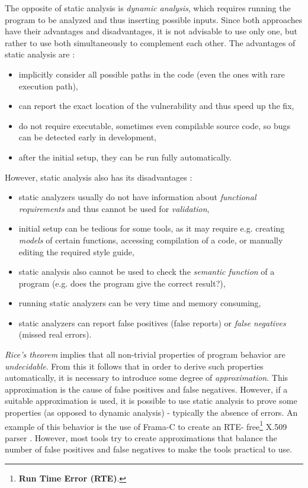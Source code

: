 The opposite of static analysis is \textit{dynamic analysis}, which requires running the program to be analyzed and thus inserting possible inputs. Since both approaches have their advantages and disadvantages, it is not advisable to use only one, but rather to use both simultaneously to complement each other. The advantages of static analysis are \cite{bc, static-analysis-pros-cons}:
\begin{itemize}
    \item implicitly consider all possible paths in the code (even the ones with rare execution path),
    \item can report the exact location of the vulnerability and thus speed up the fix,
    \item do not require executable, sometimes even compilable source code, so bugs can be detected early in development,
    \item after the initial setup, they can be run fully automatically.
\end{itemize}

However, static analysis also has its disadvantages \cite{testovani-herout, static-analysis-pros-cons}:
\begin{itemize}
    \item static analyzers usually do not have information about \textit{functional requirements} and thus cannot be used for \textit{validation},
    \item initial setup can be tedious for some tools, as it may require e.g. creating \textit{models} of certain functions, accessing compilation of a code, or manually editing the required style guide,
    \item static analysis also cannot be used to check the \textit{semantic function} of a program (e.g. does the program give the correct result?),
    \item running static analyzers can be very time and memory consuming,
    \item static analyzers can report false positives (false reports) or \textit{false negatives} (missed real errors).
\end{itemize}

\textit{Rice's theorem} implies \cite{static-analysis-spa} that all non-trivial properties of program behavior are \textit{undecidable}. From this it follows that in order to derive such properties automatically, it is necessary to introduce some degree of \textit{approximation}. This approximation is the cause of false positives and false negatives. However, if a suitable approximation is used, it is possible to use static analysis to prove some properties (as opposed to dynamic analysis) - typically the absence of errors. An example of this behavior is the use of Frama-C to create an RTE- free\footnote{\textbf{Run Time Error (RTE)}.} X.509 parser \cite{RTEFreeParser}. However, most tools try to create approximations that balance the number of false positives and false negatives to make the tools practical to use.

